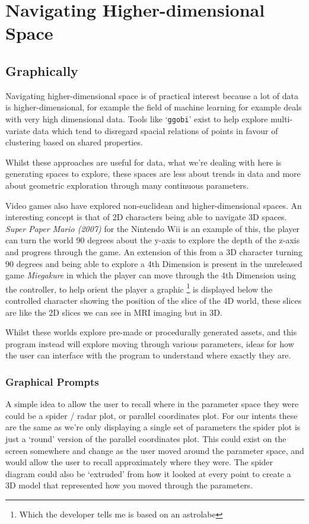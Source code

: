 \chapter{Navigating Higher-dimensional Space}
\section{Graphically}
Navigating higher-dimensional space is of practical interest because a lot of
data is higher-dimensional, for example the field of machine learning for
example deals with very high dimensional data. Tools like `\verb|ggobi|' exist
to help explore multi-variate data \citep{swayne:dsc2003} which tend to
disregard spacial relations of points in favour of clustering based on shared
properties. %

Whilst these approaches are useful for data, what we're dealing with here is
generating spaces to explore, these spaces are less about trends in data and
more about geometric exploration through many continuous parameters.

Video games also have explored non-euclidean and higher-dimensional spaces. An
interesting concept is that of 2D characters being able to navigate 3D spaces.
\emph{Super Paper Mario (2007)} for the Nintendo Wii is an example of this, the
player can turn the world 90 degrees about the y-axis to explore the depth of
the z-axis and progress through the game. An extension of this from a 3D
character turning 90 degrees and being able to explore a 4th Dimension is
present in the unreleased game \emph{Miegakure} in which the player can move
through the 4th Dimension using the controller, to help orient the player a
graphic \footnote{Which the developer tells me is based on an astrolabe} is
displayed below the controlled character showing the position of the slice of
the 4D world, these slices are like the 2D slices we can see in MRI imaging but
in 3D.

Whilst these worlds explore pre-made or procedurally generated assets, and this
program instead will explore moving through various parameters, ideas for how
the user can interface with the program to understand where exactly they are.

\subsection{Graphical Prompts}
A simple idea to allow the user to recall where in the parameter space they were
could be a spider / radar plot, or parallel coordinates plot. For our intents these
are the same as we're only displaying a single set of parameters the spider plot
is just a `round' version of the parallel coordinates plot. This could exist on
the screen somewhere and change as the user moved around the parameter space,
and would allow the user to recall approximately where they were. The spider
diagram could also be `extruded' from how it looked at every point to create a
3D model that represented how you moved through the parameters.

